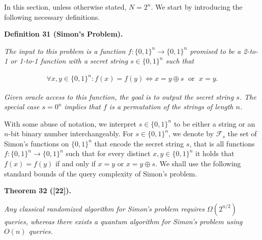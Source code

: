 In this section, unless otherwise stated, $N=2^{n}$.
We start by introducing the following necessary definitions.\par





\par\medskip\noindent\textbf{
\textbf{Definition 31}\textbf{ }(Simon’s Problem)\textbf{.}
}\par



\emph{The input to this problem is a function $f:\{0,1\}^{n}\rightarrow\{0,1\}^{n}$ promised to be a 2-to-1 or 1-to-1 function with a secret string $s\in\{0,1\}^{n}$ such that}\par


\[\begin{gathered}
\forall x,y\in\{0,1\}^{n}:f(x)=f(y)\iff x=y\oplus s\;\text{ or }\;x=y.
\end{gathered}\]


\emph{Given oracle access to this function, the goal is to output the secret string $s$. The special case $s=0^{n}$ implies that $f$ is a permutation of the strings of length $n$.}\par






With some abuse of notation, we interpret $s\in\{0,1\}^{n}$ to be either a string or an $n$-bit binary number interchangeably. For $s\in\{0,1\}^{n}$, we denote by $\mathcal{F}_{s}$ the set of Simon’s functions on $\{0,1\}^{n}$ that encode the secret string $s$, that is all functions $f:\{0,1\}^{n}\rightarrow\{0,1\}^{n}$ such that for every distinct $x,y\in\{0,1\}^{n}$ it holds that $f(x)=f(y)$ if and only if $x=y$ or $x=y\oplus s$. We shall use the following standard bounds of the query complexity of Simon’s problem.\par





\par\medskip\noindent\textbf{
\textbf{Theorem 32}\textbf{ }([22])\textbf{.}
}\par



\emph{Any classical randomized algorithm for Simon’s problem requires $\Omega(2^{n/2})$ queries, whereas there exists a quantum algorithm for Simon’s problem using $O(n)$ queries.}\par



